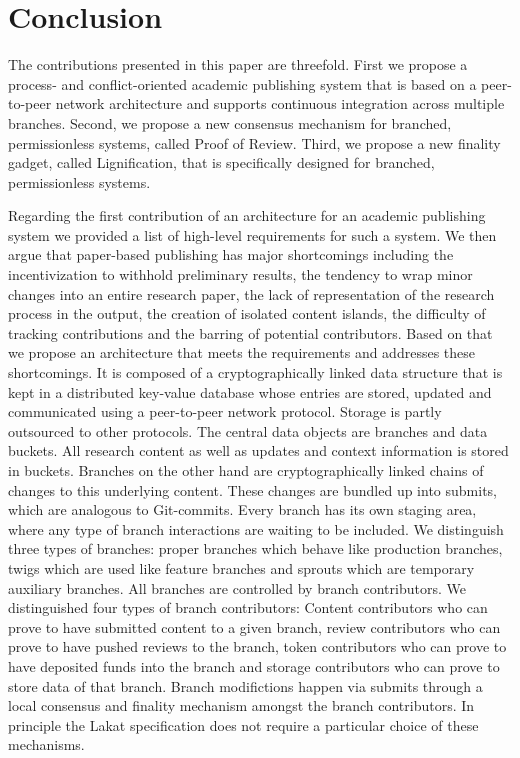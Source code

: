 \documentclass[14pt]{article}
\begin{document}
% 

\section{Conclusion}
\label{sc:conclusion}

The contributions presented in this paper are threefold. First we propose a process- and conflict-oriented academic publishing system that is based on a peer-to-peer network architecture and supports continuous integration across multiple branches. Second, we propose a new consensus mechanism for branched, permissionless systems, called Proof of Review. Third, we propose a new finality gadget, called Lignification, that is specifically designed for branched, permissionless systems. 

Regarding the first contribution of an architecture for an academic publishing system we provided a list of high-level requirements for such a system. We then argue that paper-based publishing has major shortcomings including the incentivization to withhold preliminary results, the tendency to wrap minor changes into an entire research paper, the lack of representation of the research process in the output, the creation of isolated content islands, the difficulty of tracking contributions and the barring of potential contributors. Based on that we propose an architecture that meets the requirements and addresses these shortcomings. It is composed of a cryptographically linked data structure that is kept in a distributed key-value database whose entries are stored, updated and communicated using a peer-to-peer network protocol. Storage is partly outsourced to other protocols. The central data objects are branches and data buckets. All research content as well as updates and context information is stored in buckets. Branches on the other hand are cryptographically linked chains of changes to this underlying content. These changes are bundled up into submits, which are analogous to Git-commits. Every branch has its own staging area, where any type of branch interactions are waiting to be included. We distinguish three types of branches: proper branches which behave like production branches, twigs which are used like feature branches and sprouts which are temporary auxiliary branches. All branches are controlled by branch contributors. We distinguished four types of branch contributors: Content contributors who can prove to have submitted content to a given branch, review contributors who can prove to have pushed reviews to the branch, token contributors who can prove to have deposited funds into the branch and storage contributors who can prove to store data of that branch. Branch modifictions happen via submits through a local consensus and finality mechanism amongst the branch contributors. In principle the Lakat specification does not require a particular choice of these mechanisms.
\end{document}
